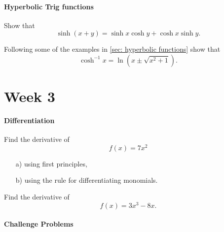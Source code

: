 \paragraph{Hyperbolic Trig functions}
\begin{problem}[$\dagger$]
Show that
\begin{equation*}
\sinh(x+y)=\sinh x \cosh y+\cosh x \sinh y.
\end{equation*}
\end{problem}

\begin{problem}[$\dagger$]
Following some of the examples in \cref{sec: hyperbolic functions} show that 
\begin{equation*}
\cosh^{-1}x=\ln\left(x\pm\sqrt{x^{2}+1}\right).
\end{equation*}
\end{problem}

\section{Week 3}
\label{sec: Tutorial sheet 3}
\paragraph{Differentiation}

\begin{problem}[$\star$]
Find the derivative of 
\begin{equation*}
f(x)=7x^{2}
\end{equation*}
\begin{itemize}
\item[a)] using first principles,
\item[b)] using the rule for differentiating monomials.
\end{itemize}
\end{problem}

\begin{problem}
Find the derivative of 
\begin{equation*}
f(x)=3x^{3}-8x.
\end{equation*}
\end{problem}



\paragraph{Challenge Problems}



